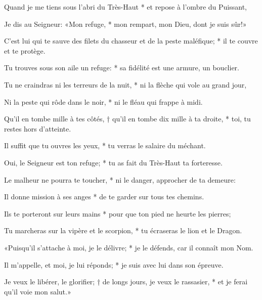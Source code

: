\item Quand je me tiens sous l'abri du Très-Haut * et repose à l'ombre du Puissant,
\item Je dis au Seigneur: «Mon refuge, * mon rempart, mon Dieu, dont je suis sûr!»
\item C'est lui qui te sauve des filets du chasseur et de la peste maléfique; * il te couvre et te protège.
\item Tu trouves sous son aile un refuge: * sa fidélité est une armure, un bouclier.
\item Tu ne craindras ni les terreurs de la nuit, * ni la flèche qui vole au grand jour,
\item Ni la peste qui rôde dans le noir, * ni le fléau qui frappe à midi.
\item Qu'il en tombe mille à tes côtés, † qu'il en tombe dix mille à ta droite, * toi, tu restes hors d'atteinte.
\item Il suffit que tu ouvres les yeux, * tu verras le salaire du méchant.
\item Oui, le Seigneur est ton refuge; * tu as fait du Très-Haut ta forteresse.
\item Le malheur ne pourra te toucher, * ni le danger, approcher de ta demeure:
\item Il donne mission à ses anges * de te garder sur tous tes chemins.
\item Ils te porteront sur leurs mains * pour que ton pied ne heurte les pierres;
\item Tu marcheras sur la vipère et le scorpion, * tu écraseras le lion et le Dragon.
\item «Puisqu'il s'attache à moi, je le délivre; * je le défends, car il connaît mon Nom.
\item Il m'appelle, et moi, je lui réponds; * je suis avec lui dans son épreuve.
\item Je veux le libérer, le glorifier; † de longs jours, je veux le rassasier, * et je ferai qu'il voie mon salut.»
